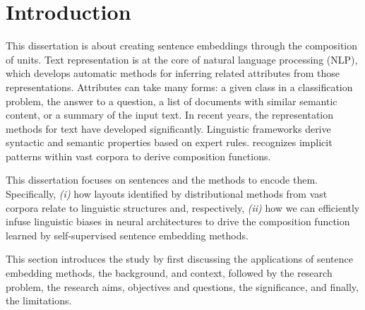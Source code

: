 \setchapterpreamble[u]{\margintoc}
\chapter{Introduction}





This dissertation is about creating sentence embeddings through the composition of   units. Text representation is at the core of natural language processing (NLP), which develops automatic methods for inferring related attributes from those representations. Attributes can take many forms: a given class in a classification problem, the answer to a question, a list of documents with similar semantic content, or a summary of the input text. In recent years, the representation methods for text have developed significantly. Linguistic frameworks derive syntactic and semantic properties based on expert rules.  recognizes implicit patterns within vast corpora to derive composition functions.

This dissertation focuses on sentences and the methods to encode them. Specifically, \textit{(i)} how layouts identified by distributional methods from vast corpora relate to linguistic structures and, respectively, \textit{(ii)} how we can efficiently infuse linguistic biases in neural architectures to drive the composition function learned by self-supervised sentence embedding methods.

This section introduces the study by first discussing the applications of sentence embedding methods, the background, and context, followed by the research problem, the research aims, objectives and questions, the significance, and finally, the limitations.

